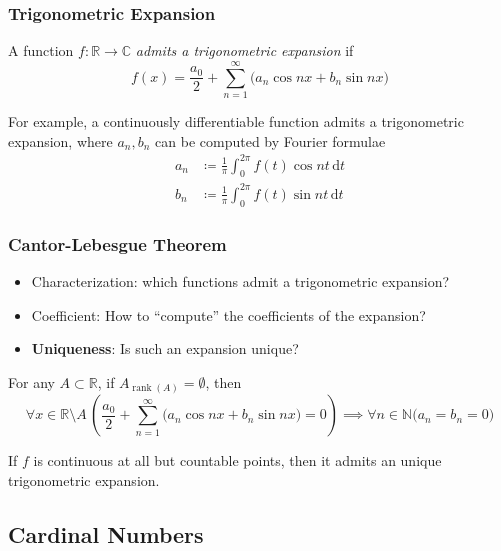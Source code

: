 \documentclass[UTF8,11pt,colorlinks,compress,openany]{beamer}%
\begin{document}
\begin{frame}\frametitle{Trigonometric Expansion}
	\begin{definition}
	A function $f:\mathbb{R}\to\mathbb{C}$ \emph{admits a trigonometric expansion} if
	\[f(x)=\dfrac{a_0}{2}+\sum\limits_{n=1}^\infty\big(a_n\cos nx+b_n\sin nx\big)\]
	\end{definition}
	For example, a continuously differentiable function admits a trigonometric expansion, where $a_n,b_n$ can be computed by Fourier formulae
	\begin{align*}
	a_n&\coloneqq \frac{1}{\pi}\int_0^{2\pi}\!\!f(t)\cos nt\,\mathrm{d} t\\
	b_n&\coloneqq \frac{1}{\pi}\int_0^{2\pi}\!\!f(t)\sin nt\,\mathrm{d} t
	\end{align*}
\end{frame}

\begin{frame}\frametitle{Cantor-Lebesgue Theorem}
	\begin{itemize}
		\item Characterization: which functions admit a trigonometric expansion?
		\item Coefficient: How to ``compute'' the coefficients of the expansion?
		\item \textbf{Uniqueness}: Is such an expansion unique?
	\end{itemize}
	\begin{theorem}
		For any $A\subset\mathbb{R}$, if $A_{\operatorname{rank}(A)}=\emptyset$, then
		\[\forall x\in\mathbb{R}\!\setminus\!A\,\left(\dfrac{a_0}{2}+\sum\limits_{n=1}^\infty\big(a_n\cos nx+b_n\sin nx\big)=0\right)\implies\forall n\in\mathbb{N}\big(a_n=b_n=0\big)\]
	\end{theorem}
	If $f$ is continuous at all but countable points, then it admits an unique trigonometric expansion.
\end{frame}

\subsection{Cardinal Numbers}
\end{document}
